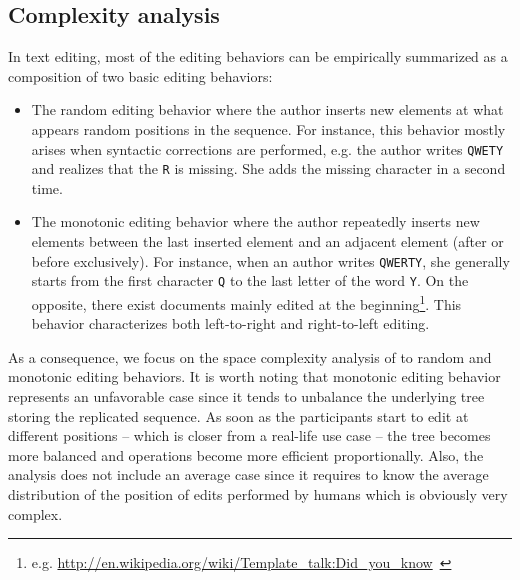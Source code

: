 \subsection{Complexity analysis}
\label{subsec:complexity}

In text editing, most of the editing behaviors can be empirically summarized as
a composition of two basic editing behaviors:
\begin{itemize}
\item The random editing behavior where the author inserts new elements at what
  appears random positions in the sequence. For instance, this behavior mostly
  arises when syntactic corrections are performed, e.g. the author writes
  \texttt{QWETY} and realizes that the \texttt{R} is missing. She adds the
  missing character in a second time.
\item The monotonic editing behavior where the author repeatedly inserts new
  elements between the last inserted element and an adjacent element (after or
  before exclusively). For instance, when an author writes \texttt{QWERTY}, she
  generally starts from the first character \texttt{Q} to the last letter of the
  word \texttt{Y}. On the opposite, there exist documents mainly edited at the
  beginning\footnote{e.g. \url{http://en.wikipedia.org/wiki/Template_talk:Did_you_know}~\cite{nedelec2013lseq}}. This
  behavior characterizes both left-to-right and right-to-left editing.
\end{itemize}

\noindent As a consequence, we focus on the space complexity analysis of \LSEQ
to random and monotonic editing behaviors. It is worth noting that monotonic
editing behavior represents an unfavorable case since it tends to unbalance the
underlying tree storing the replicated sequence. As soon as the participants
start to edit at different positions -- which is closer from a real-life use
case -- the tree becomes more balanced and operations become more efficient
proportionally. Also, the analysis does not include an average case since it
requires to know the average distribution of the position of edits performed by
humans which is obviously very complex.

